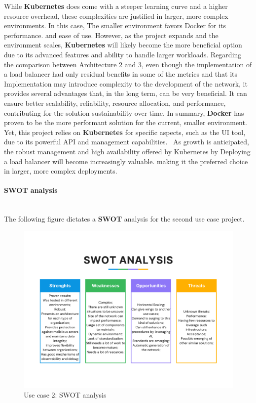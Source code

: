 While \textbf{Kubernetes} does come with a steeper learning
curve and a higher resource overhead, these complexities are
justified in larger, more complex environments. In this case,
The smaller environment favors Docker for its performance.
and ease of use. However, as the project expands and the
environment scales, \textbf{Kubernetes} will likely become the more
beneficial option due to its advanced features and ability to
handle larger workloads.
Regarding the comparison between Architecture 2 and 3,
even though the implementation of a load balancer had only
residual benefits in some of the metrics and that its
Implementation may introduce complexity to the
development of the network, it provides several advantages
that, in the long term, can be very beneficial. It can ensure
better scalability, reliability, resource allocation, and
performance, contributing for the solution sustainability over
time.
In summary, \textbf{Docker} has proven to be the more
performant solution for the current, smaller environment.
Yet, this project relies on \textbf{Kubernetes} for specific aspects,
such as the UI tool, due to its powerful API and management
capabilities.  As growth is anticipated, the robust
management and high availability offered by Kubernetes by
Deploying a load balancer will become increasingly valuable.
making it the preferred choice in larger, more complex
deployments. 

\paragraph{SWOT analysis}\mbox{}\\

The following figure dictates a \textbf{SWOT} analysis for the second use case project.

\begin{figure}[H]
	\centering
	\includegraphics[width=0.5\linewidth]{assets/use-case-2/SWOT-use-case-2}
	\caption{Use case 2: SWOT analysis}
	\label{fig:swot-use-case-2}
\end{figure}

